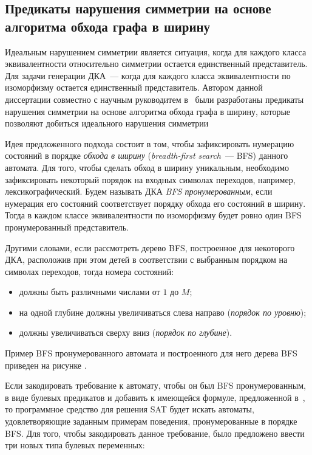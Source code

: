 \subsection{Предикаты нарушения симметрии на основе алгоритма обхода графа в ширину}
\label{sec:review:sym-breaking:bfs-based}

Идеальным нарушением симметрии является ситуация, когда для каждого класса эквивалентности относительно симметрии остается единственный представитель. 
Для задачи генерации ДКА~{---} когда для каждого класса эквивалентности по изоморфизму остается единственный представитель.
Автором данной диссертации совместно с научным руководитем  в~\cite{zakirzyanov2015LATA} были разработаны предикаты нарушения симметрии на основе алгоритма обхода графа в ширину, которые позволяют добиться идеального нарушения симметрии

Идея предложенного подхода состоит в том, чтобы зафиксировать нумерацию состояний в порядке \emph{обхода в ширину} (\emph{breadth-first search}~{---} BFS) данного автомата.
Для того, чтобы сделать обход в ширину уникальным, необходимо зафиксировать некоторый порядок на входных символах переходов, например, лексикографический. 
Будем называть ДКА \emph{BFS пронумерованным}, если нумерация его состояний соответствует порядку обхода его состояний в ширину.
Тогда в каждом классе эквивалентности по изоморфизму будет ровно один BFS пронумерованный представитель.

Другими словами, если рассмотреть дерево BFS, построенное для некоторого ДКА, расположив при этом детей в соответствии с выбранным порядком на символах переходов, тогда номера состояний:
\begin{itemize}
  \item должны быть различными числами от $1$ до $M$;
  \item на одной глубине должны увеличиваться слева направо (\emph{порядок по уровню});
  \item должны увеличиваться сверху вниз (\emph{порядок по глубине}).
\end{itemize}
Пример BFS пронумерованного автомата и построенного для него дерева BFS приведен на рисунке .

Если закодировать требование к автомату, чтобы он был BFS пронумерованным, в виде булевых предикатов и добавить к имеющейся формуле, предложенной в~\cite{heule-icgi10}, то программное средство для решения SAT будет искать автоматы, удовлетворяющие заданным примерам поведения, пронумерованные в порядке BFS.
Для того, чтобы закодировать данное требование, было предложено ввести три новых типа булевых переменных:

